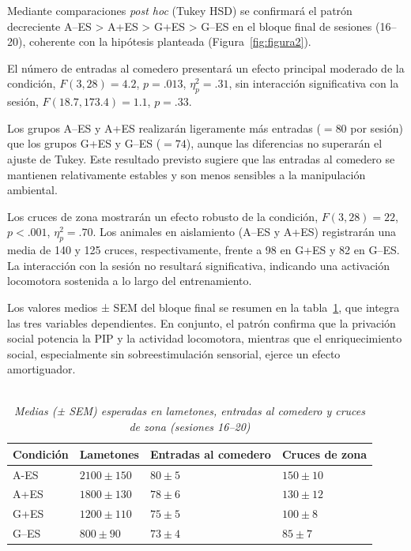 \documentclass[12pt,a4paper]{article}
\begin{document}
\begin{multicols}{2}
Mediante comparaciones \textit{post hoc} (Tukey HSD) se confirmará el patrón decreciente A--ES > A+ES > G+ES > G--ES en el bloque final de sesiones (16–20), coherente con la hipótesis planteada (Figura~\ref{fig:figura2}).

El número de entradas al comedero presentará un efecto principal moderado de la condición, $F(3, 28) = 4.2$, $p = .013$, $\eta^2_p = .31$, sin interacción significativa con la sesión, $F(18.7, 173.4) = 1.1$, $p = .33$.

Los grupos A--ES y A+ES realizarán ligeramente más entradas ($= 80$ por sesión) que los grupos G+ES y G--ES ($= 74$), aunque las diferencias no superarán el ajuste de Tukey. Este resultado previsto sugiere que las entradas al comedero se mantienen relativamente estables y son menos sensibles a la manipulación ambiental.

Los cruces de zona mostrarán un efecto robusto de la condición, $F(3, 28) = 22$, $p < .001$, $\eta^2_p = .70$. Los animales en aislamiento (A--ES y A+ES) registrarán una media de 140 y 125 cruces, respectivamente, frente a 98 en G+ES y 82 en G--ES. La interacción con la sesión no resultará significativa, indicando una activación locomotora sostenida a lo largo del entrenamiento.

Los valores medios ± SEM del bloque final se resumen en la tabla~\ref{tab:tabla1}, que integra las tres variables dependientes. En conjunto, el patrón confirma que la privación social potencia la PIP y la actividad locomotora, mientras que el enriquecimiento social, especialmente sin sobreestimulación sensorial, ejerce un efecto amortiguador.


\begin{table}[t]
    \centering
    \begin{doublespace}
    \captionsetup{labelfont=bf, labelsep=none}
    \caption{\textit{\protect\\Medias (± SEM) esperadas en lametones, entradas al comedero y cruces de zona (sesiones 16--20)}}
    \label{tab:tabla1}
    \end{doublespace}
    \begin{tabularx}{\textwidth}{lXXX}
    \toprule
    \textbf{Condición} & \textbf{Lametones} & \textbf{Entradas al comedero} & \textbf{Cruces de zona} \\
    \midrule
    A-ES   & $2100 \pm 150$ & $80 \pm 5$ & $150 \pm 10$ \\
    A+ES  & $1800 \pm 130$ & $78 \pm 6$ & $130 \pm 12$ \\
    G+ES  & $1200 \pm 110$ & $75 \pm 5$ & $100 \pm 8$ \\
    G--ES & $800 \pm 90$   & $73 \pm 4$ & $85 \pm 7$ \\
    \bottomrule
    \end{tabularx}
    \vspace{1mm}
\end{table}



\end{multicols}
\end{document}
